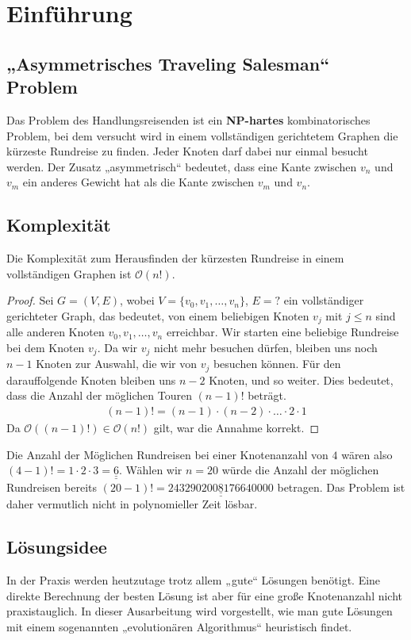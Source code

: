 \section{Einführung}
\subsection{„Asymmetrisches Traveling Salesman“ Problem}
Das Problem des Handlungsreisenden ist ein
\textbf{NP-hartes} kombinatorisches Problem, bei dem versucht wird in
einem vollständigen gerichtetem Graphen die kürzeste Rundreise zu finden. Jeder
Knoten darf dabei nur einmal besucht werden. Der Zusatz „asymmetrisch“
bedeutet, dass eine Kante zwischen $v_n$ und $v_m$ ein anderes Gewicht
hat als die Kante zwischen $v_m$ und $v_n$.

\subsection{Komplexität}
\begin{theorem}
Die Komplexität zum Herausfinden der kürzesten Rundreise in einem
vollständigen Graphen ist $\mathcal{O}(n!)$. 
\end{theorem}

\begin{proof}
Sei $G=(V,E)$, wobei $V = \{ v_0, v_1, \dotsc, v_n\}$, $E= ?$ ein
vollständiger gerichteter Graph, das bedeutet, von einem
beliebigen Knoten $v_j$ mit $j \leq n$ sind alle anderen Knoten $v_0, v_1, \dotsc, v_n$
erreichbar. Wir starten eine beliebige Rundreise bei dem Knoten $v_j$.
Da wir $v_j$ nicht mehr besuchen dürfen, bleiben uns noch 
$n-1$ Knoten zur Auswahl, die wir von $v_j$ besuchen können. Für den
darauffolgende Knoten bleiben uns $n-2$ Knoten, und so weiter. Dies bedeutet, dass 
die Anzahl der möglichen Touren $(n-1)!$ beträgt.
\begin{align*}
  (n-1)! = (n-1) \cdot (n-2) \cdot \dotsc \cdot 2 \cdot 1
\end{align*}
Da $\mathcal{O}((n-1)!) \in \mathcal{O}(n!)$ gilt, war die Annahme
korrekt.
\end{proof}
\begin{bem}
Die Anzahl der Möglichen Rundreisen bei einer Knotenanzahl von $4$ wären also
$(4-1)! = 1 \cdot 2 \cdot 3 =\underline{\underline{6}}$. Wählen wir $n = 20$ würde die
Anzahl der möglichen Rundreisen bereits $(20-1)! =
\underline{\underline{2432902008176640000}}$ betragen.
Das Problem ist daher vermutlich nicht in polynomieller Zeit lösbar.
\end{bem}

\subsection{Lösungsidee}
In der Praxis werden heutzutage trotz allem „gute“ Lösungen benötigt.
Eine direkte Berechnung der besten Lösung ist aber für eine große
Knotenanzahl nicht praxistauglich. In dieser Ausarbeitung wird
vorgestellt, wie man gute Lösungen mit einem sogenannten „evolutionären
Algorithmus“ heuristisch findet.

